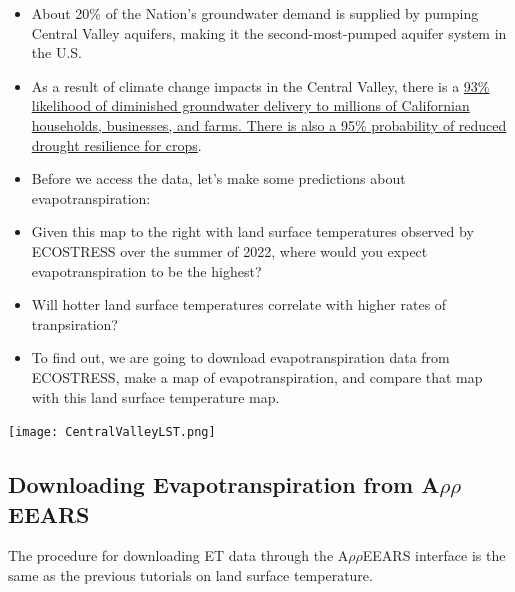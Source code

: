 \documentclass[oneside,a4paper,11pt,explicit]{book}
\begin{document}
\begin{tcolorbox}[colback=yellow!5!white,colframe=IceCreamLeaf,title=\textbf{California's Central Valley}]
\begin{multicols}{2}
\begin{itemize}
			\item About 20\% of the Nation's groundwater demand is supplied by pumping Central Valley aquifers, making it the second-most-pumped aquifer system in the U.S.
			\item As a result of climate change impacts in the Central Valley, there is a \href{https://www.energy.ca.gov/sites/default/files/2019-12/Water_CCCA4-EXT-2018-001_ada.pdf}{93\% likelihood of diminished groundwater delivery to millions of Californian households, businesses, and farms. There is also a 95\% probability of reduced drought resilience for crops}. 
		\end{itemize}
	\end{multicols}
\end{tcolorbox}

\begin{tcolorbox}[colback=yellow!5!white,colframe=IceCreamLeaf,title=\textbf{Hypotheses}]
	\begin{multicols}{2}

		\vspace*{.25em}

		\begin{itemize}
			\item Before we access the data, let's make some predictions about evapotranspiration:
			\item Given this map to the right with land surface temperatures observed by ECOSTRESS over the summer of 2022, where would you expect evapotranspiration to be the highest?
			\item Will hotter land surface temperatures correlate with higher rates of tranpsiration?
			\item To find out, we are going to download evapotranspiration data from ECOSTRESS, make a map of evapotranspiration, and compare that map with this land surface temperature map.
		\end{itemize}

		\columnbreak	

		\centerline{\texttt{[image: CentralValleyLST.png]}}
		
	\end{multicols}
\end{tcolorbox}

\subsection{Downloading Evapotranspiration from A$\rho\rho$EEARS}

The procedure for downloading ET data through the A$\rho\rho$EEARS interface is the same as the previous tutorials on land surface temperature.
\end{document}
